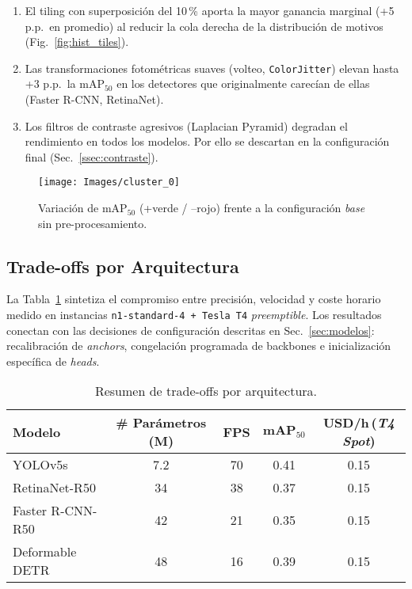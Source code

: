 \begin{enumerate}
  \item El tiling con superposición del 10\,\% aporta la mayor ganancia marginal (+5 p.p.\ en promedio) al reducir la cola derecha de la distribución de motivos (Fig.~\ref{fig:hist_tiles}).
  \item Las transformaciones fotométricas suaves (volteo, \texttt{ColorJitter}) elevan hasta +3 p.p.\ la \(\text{mAP}_{50}\) en los detectores que originalmente carecían de ellas (Faster R-CNN, RetinaNet).
  \item Los filtros de contraste agresivos (Laplacian Pyramid) degradan el rendimiento en todos los modelos.
  Por ello se descartan en la configuración final (Sec.~\ref{ssec:contraste}).
\end{enumerate}

\begin{figure}[!h]
  \centering
  \texttt{[image: Images/cluster\_0]}
  \caption{Variación de \(\text{mAP}_{50}\) (+verde / –rojo) frente a la configuración \emph{base} sin pre-procesamiento.}
  \label{fig:heatmap_pp}
\end{figure}

\subsection{Trade-offs por Arquitectura}

La Tabla~\ref{tab:tradeoff} sintetiza el compromiso entre precisión, velocidad y coste horario medido en instancias \texttt{n1-standard-4 + Tesla T4} \emph{preemptible}.
Los resultados conectan con las decisiones de configuración descritas en Sec.~\ref{sec:modelos}: recalibración de \emph{anchors}, congelación programada de backbones e inicialización específica de \emph{heads}.

\begin{table}[!h]
\centering
\caption{Resumen de trade-offs por arquitectura.}
\label{tab:tradeoff}
\begin{tabular}{|l|c|c|c|c|}
\hline
\textbf{Modelo} & \textbf{\# Parámetros (M)} & \textbf{FPS} & \(\textbf{mAP}_{50}\) & \textbf{USD/h}\footnotesize{\,(\textit{T4 Spot})} \\ \hline
YOLOv5s          & 7.2  & 70 & 0.41 & 0.15 \\ \hline
RetinaNet-R50    & 34   & 38 & 0.37 & 0.15 \\ \hline
Faster R-CNN-R50 & 42   & 21 & 0.35 & 0.15 \\ \hline
Deformable DETR  & 48   & 16 & 0.39 & 0.15 \\ \hline
\end{tabular}
\end{table}

